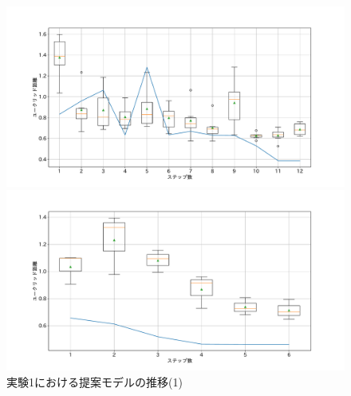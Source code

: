 \begin{figure}[h]
\begin{minipage}[b]{0.48\linewidth}
 \end{minipage}\\
 \begin{minipage}[b]{0.48\linewidth}
  \centering
  \includegraphics[scale=0.15]{./imgs/gaChange/cake1_4.pdf}
 \end{minipage}
 \begin{minipage}[b]{0.48\linewidth}
  \centering
  \includegraphics[scale=0.15]{./imgs/gaChange/cake2_4.pdf}
 \end{minipage}
 \caption{実験1における提案モデルの推移(1)}\label{fig:gaChange1_1}
\end{figure}

